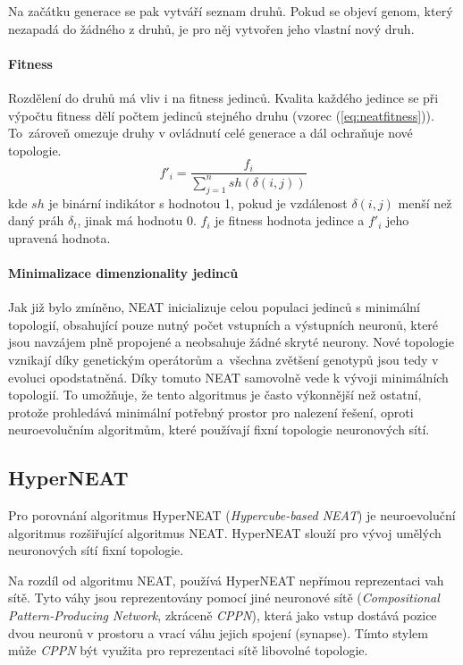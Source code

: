 Na začátku generace se pak vytváří seznam druhů. Pokud se objeví genom, který
nezapadá do žádného z druhů, je pro něj vytvořen jeho vlastní nový druh.

\paragraph{Fitness}
Rozdělení do druhů má vliv i na fitness jedinců. Kvalita každého jedince se při
výpočtu fitness dělí počtem jedinců stejného druhu (vzorec
(\ref{eq:neatfitness})). To~zároveň omezuje druhy v ovládnutí celé generace a
dál ochraňuje nové topologie.
\begin{equation} \label{eq:neatfitness}
    f'_i = \frac{f_i}{\sum_{j=1}^n sh(\delta(i,j))}
\end{equation}
kde $sh$ je binární indikátor s hodnotou 1, pokud je vzdálenost $\delta(i,j)$
menší než daný práh $\delta_t$, jinak má hodnotu 0. $f_i$ je fitness hodnota
jedince a $f'_i$ jeho upravená hodnota.

\paragraph{Minimalizace dimenzionality jedinců}
Jak již bylo zmíněno, NEAT inicializuje celou populaci jedinců s minimální
topologií, obsahující pouze nutný počet vstupních a výstupních neuronů,
které jsou navzájem plně propojené a neobsahuje žádné skryté neurony. Nové
topologie vznikají díky genetickým operátorům a~všechna zvětšení genotypů jsou
tedy v evoluci opodstatněná. Díky tomuto NEAT samovolně vede k vývoji
minimálních topologií. To umožňuje, že tento algoritmus je často výkonnější než
ostatní, protože prohledává minimální potřebný prostor pro nalezení řešení,
oproti neuroevolučním algoritmům, které používají fixní topologie neuronových
sítí.

\subsection{HyperNEAT} \label{NN - HyperNEAT}
Pro porovnání algoritmus HyperNEAT (\emph{Hypercube-based NEAT})
\citep{stanley2009hypercube} \citep{eplex} je neuroevoluční algoritmus
rozšiřující algoritmus NEAT. HyperNEAT slouží pro vývoj umělých neuronových
sítí fixní topologie. 

Na rozdíl od algoritmu NEAT, používá HyperNEAT nepřímou
reprezentaci vah sítě. Tyto váhy jsou reprezentovány pomocí jiné neuronové
sítě (\emph{Compositional Pattern-Producing Network}, zkráceně \emph{CPPN}),
která jako vstup dostává pozice dvou neuronů v prostoru a vrací váhu jejich
spojení (synapse). Tímto stylem může \emph{CPPN} být využita pro reprezentaci
sítě libovolné topologie. 

